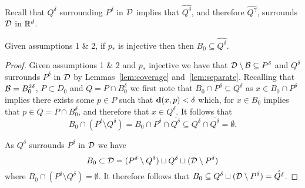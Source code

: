 Recall that $Q^\delta$ surrounding $P^\delta$ in ${\mathcal{D}}$ implies that $\hat{Q^\delta}$, and therefore $\hat{Q^\gamma}$, surrounds ${\mathcal{D}}$ in $\mathbb{R}^d$.
%

\begin{lemma}\label{lem:qdcontain}
  Given assumptions 1 \& 2, if $p_*$ is injective then then $B_0\subseteq \hat{Q^\delta}$.
\end{lemma}
\begin{proof}
  Given assumptions 1 \& 2 and $p_*$ injective we have that ${\mathcal{D}}\setminus {\mathcal{B}}\subseteq P^\delta$ and $Q^\delta$ surrounds $P^\delta$ in ${\mathcal{D}}$ by Lemmas~\ref{lem:coverage} and~\ref{lem:separate}.
  Recalling that ${\mathcal{B}} = B_0^{2\delta}$, $P\subset D_0$ and $Q = P\cap B_0^\delta$ we first note that $B_0\cap P^\delta\subseteq Q^\delta$ as $x\in B_0\cap P^\delta$ implies there exists some $p\in P$ such that $\mathbf{d}(x, p) < \delta$ which, for $x\in B_0$ implies that $p\in Q = P\cap B_0^\delta$, and therefore that $x\in Q^\delta$.
  It follows that
  \[B_0\cap (P^\delta\setminus Q^\delta) = B_0\cap P^\delta\cap \overline{Q^\delta} \subseteq Q^\delta\cap\overline{Q^\delta} = \emptyset.\]

  As $Q^\delta$ surrounds $P^\delta$ in ${\mathcal{D}}$ we have
  \[ B_0 \subset {\mathcal{D}} = (P^\delta\setminus Q^\delta)\sqcup Q^\delta \sqcup ({\mathcal{D}}\setminus P^\delta)\]
  where $B_0\cap (P^\delta\setminus Q^\delta) = \emptyset$.
  It therefore follows that $B_0\subseteq Q^\delta \sqcup ({\mathcal{D}}\setminus P^\delta) = \hat{Q^\delta}$.
\end{proof}

